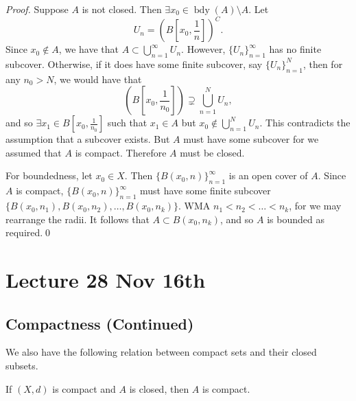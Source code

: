 \documentclass[notoc,notitlepage]{tufte-book}
\DeclareMathOperator{\bdy}{bdy }
\begin{document}
\begin{proof}
  Suppose $A$ is not closed. Then $\exists x_0 \in \bdy(A) \setminus A$. Let
  \begin{equation*}
    U_n = \left( B \left[ x_0, \frac{1}{n} \right] \right)^C.
  \end{equation*}
  Since $x_0 \notin A$, we have that $A \subset \bigcup_{n=1}^{\infty} U_n$. However, $\{ U_n \}_{n = 1}^{\infty}$ has no finite subcover. Otherwise, if it does have some finite subcover, say $\{ U_n \}_{n = 1}^{N}$, then for any $n_0 > N$, we would have that
  \begin{equation*}
    \left( B \left[ x_0, \frac{1}{n_0} \right] \right) \supsetneq \bigcup_{n=1}^{N} U_n,
  \end{equation*}
  and so $\exists x_1 \in B \left[ x_0, \frac{1}{n_0} \right]$ such that $x_1 \in A$ but $x_0 \notin \bigcup_{n=1}^{N} U_n$. This contradicts the assumption that a subcover exists. But $A$ must have some subcover for we assumed that $A$ is compact. Therefore $A$ must be closed.

  For boundedness, let $x_0 \in X$. Then $\{ B(x_0, n) \}_{n = 1}^{\infty}$ is an open cover of $A$. Since $A$ is compact, $\{ B(x_0, n) \}_{n = 1}^{\infty}$ must have some finite subcover $\{ B(x_0, n_1), B(x_0, n_2), \ldots, B(x_0, n_k) \}$. WMA $n_1 < n_2 < \hdots < n_k$, for we may rearrange the radii. It follows that $A \subset B(x_0, n_k)$, and so $A$ is bounded as required.\qed\
\end{proof}



\chapter{Lecture 28 Nov 16th}%
\label{chp:lecture_28_nov_16th}

\section{Compactness (Continued)}%
\label{sec:compactness_continued}

We also have the following relation between compact sets and their closed subsets.

\begin{propo}\label{propo:closed_subsets_of_compact_sets_are_compact}
  If $(X, d)$ is compact and $A$ is closed, then $A$ is compact.
\end{propo}
\end{document}
